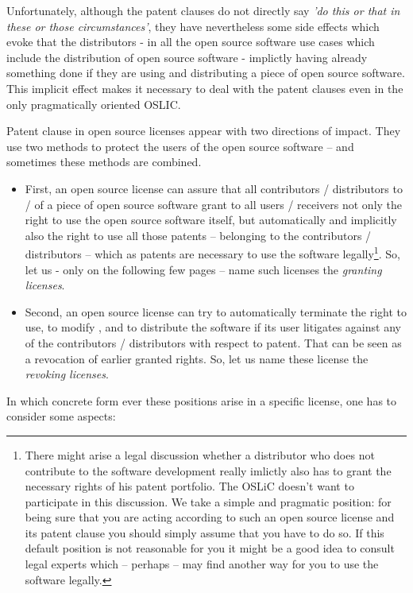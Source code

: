 Unfortunately, although the patent clauses do not directly say \emph{'do this or
that in these or those circumstances'}, they have nevertheless some side effects
which evoke that the distributors - in all the open source software use cases
which include the distribution of open source software - implictly having
already something done if they are using and distributing a piece of open source
software. This implicit effect makes it necessary to deal with the patent
clauses even in the only pragmatically oriented OSLIC.

Patent clause in open source licenses appear with two directions of impact. They
use two methods to protect the users of the open source software -- and
sometimes these methods are combined.

\begin{itemize}
  \item First, an open source license can assure that all contributors /
  distributors to / of a piece of open source software grant to all users /
  receivers not only the right to use the open source software itself, but
  automatically and implicitly also the right to use all those patents --
  belonging to the contributors / distributors -- which as patents are necessary
  to use the software legally\footnote{There might arise a legal discussion
  whether a distributor who does not contribute to the software development
  really imlictly also has to grant the necessary rights of his patent
  portfolio. The OSLiC doesn't want to participate in this discussion. We take a
  simple and pragmatic position: for being sure that you are acting according to
  such an open source license and its patent clause you should simply assume
  that you have to do so. If this default position is not reasonable for you it
  might be a good idea to consult legal experts which -- perhaps -- may find
  another way for you to use the software legally.}. So, let us - only on the
  following few pages -- name such licenses the \emph{granting licenses}.
  \item Second, an open source license can try to automatically terminate the
  right to use, to modify , and to distribute the software if its user litigates
  against any of the contributors / distributors with respect to patent. That
  can be seen as a revocation of earlier granted rights. So, let us name these
  license the \emph{revoking licenses}.
\end{itemize}

In which concrete form ever these positions arise in a specific license, one has
to consider some aspects:

